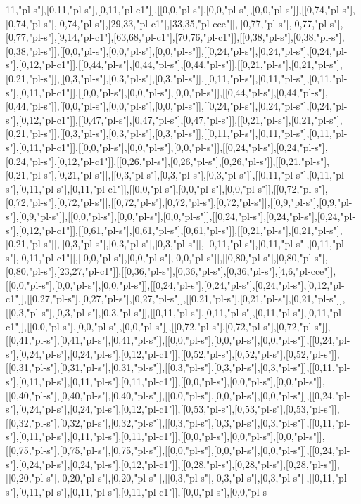 11,"pl-s"],[0,11,"pl-s"],[0,11,"pl-c1"]],[[0,0,"pl-s"],[0,0,"pl-s"],[0,0,"pl-s"]],[[0,74,"pl-s"],[0,74,"pl-s"],[0,74,"pl-s"],[29,33,"pl-c1"],[33,35,"pl-cce"]],[[0,77,"pl-s"],[0,77,"pl-s"],[0,77,"pl-s"],[9,14,"pl-c1"],[63,68,"pl-c1"],[70,76,"pl-c1"]],[[0,38,"pl-s"],[0,38,"pl-s"],[0,38,"pl-s"]],[[0,0,"pl-s"],[0,0,"pl-s"],[0,0,"pl-s"]],[[0,24,"pl-s"],[0,24,"pl-s"],[0,24,"pl-s"],[0,12,"pl-c1"]],[[0,44,"pl-s"],[0,44,"pl-s"],[0,44,"pl-s"]],[[0,21,"pl-s"],[0,21,"pl-s"],[0,21,"pl-s"]],[[0,3,"pl-s"],[0,3,"pl-s"],[0,3,"pl-s"]],[[0,11,"pl-s"],[0,11,"pl-s"],[0,11,"pl-s"],[0,11,"pl-c1"]],[[0,0,"pl-s"],[0,0,"pl-s"],[0,0,"pl-s"]],[[0,44,"pl-s"],[0,44,"pl-s"],[0,44,"pl-s"]],[[0,0,"pl-s"],[0,0,"pl-s"],[0,0,"pl-s"]],[[0,24,"pl-s"],[0,24,"pl-s"],[0,24,"pl-s"],[0,12,"pl-c1"]],[[0,47,"pl-s"],[0,47,"pl-s"],[0,47,"pl-s"]],[[0,21,"pl-s"],[0,21,"pl-s"],[0,21,"pl-s"]],[[0,3,"pl-s"],[0,3,"pl-s"],[0,3,"pl-s"]],[[0,11,"pl-s"],[0,11,"pl-s"],[0,11,"pl-s"],[0,11,"pl-c1"]],[[0,0,"pl-s"],[0,0,"pl-s"],[0,0,"pl-s"]],[[0,24,"pl-s"],[0,24,"pl-s"],[0,24,"pl-s"],[0,12,"pl-c1"]],[[0,26,"pl-s"],[0,26,"pl-s"],[0,26,"pl-s"]],[[0,21,"pl-s"],[0,21,"pl-s"],[0,21,"pl-s"]],[[0,3,"pl-s"],[0,3,"pl-s"],[0,3,"pl-s"]],[[0,11,"pl-s"],[0,11,"pl-s"],[0,11,"pl-s"],[0,11,"pl-c1"]],[[0,0,"pl-s"],[0,0,"pl-s"],[0,0,"pl-s"]],[[0,72,"pl-s"],[0,72,"pl-s"],[0,72,"pl-s"]],[[0,72,"pl-s"],[0,72,"pl-s"],[0,72,"pl-s"]],[[0,9,"pl-s"],[0,9,"pl-s"],[0,9,"pl-s"]],[[0,0,"pl-s"],[0,0,"pl-s"],[0,0,"pl-s"]],[[0,24,"pl-s"],[0,24,"pl-s"],[0,24,"pl-s"],[0,12,"pl-c1"]],[[0,61,"pl-s"],[0,61,"pl-s"],[0,61,"pl-s"]],[[0,21,"pl-s"],[0,21,"pl-s"],[0,21,"pl-s"]],[[0,3,"pl-s"],[0,3,"pl-s"],[0,3,"pl-s"]],[[0,11,"pl-s"],[0,11,"pl-s"],[0,11,"pl-s"],[0,11,"pl-c1"]],[[0,0,"pl-s"],[0,0,"pl-s"],[0,0,"pl-s"]],[[0,80,"pl-s"],[0,80,"pl-s"],[0,80,"pl-s"],[23,27,"pl-c1"]],[[0,36,"pl-s"],[0,36,"pl-s"],[0,36,"pl-s"],[4,6,"pl-cce"]],[[0,0,"pl-s"],[0,0,"pl-s"],[0,0,"pl-s"]],[[0,24,"pl-s"],[0,24,"pl-s"],[0,24,"pl-s"],[0,12,"pl-c1"]],[[0,27,"pl-s"],[0,27,"pl-s"],[0,27,"pl-s"]],[[0,21,"pl-s"],[0,21,"pl-s"],[0,21,"pl-s"]],[[0,3,"pl-s"],[0,3,"pl-s"],[0,3,"pl-s"]],[[0,11,"pl-s"],[0,11,"pl-s"],[0,11,"pl-s"],[0,11,"pl-c1"]],[[0,0,"pl-s"],[0,0,"pl-s"],[0,0,"pl-s"]],[[0,72,"pl-s"],[0,72,"pl-s"],[0,72,"pl-s"]],[[0,41,"pl-s"],[0,41,"pl-s"],[0,41,"pl-s"]],[[0,0,"pl-s"],[0,0,"pl-s"],[0,0,"pl-s"]],[[0,24,"pl-s"],[0,24,"pl-s"],[0,24,"pl-s"],[0,12,"pl-c1"]],[[0,52,"pl-s"],[0,52,"pl-s"],[0,52,"pl-s"]],[[0,31,"pl-s"],[0,31,"pl-s"],[0,31,"pl-s"]],[[0,3,"pl-s"],[0,3,"pl-s"],[0,3,"pl-s"]],[[0,11,"pl-s"],[0,11,"pl-s"],[0,11,"pl-s"],[0,11,"pl-c1"]],[[0,0,"pl-s"],[0,0,"pl-s"],[0,0,"pl-s"]],[[0,40,"pl-s"],[0,40,"pl-s"],[0,40,"pl-s"]],[[0,0,"pl-s"],[0,0,"pl-s"],[0,0,"pl-s"]],[[0,24,"pl-s"],[0,24,"pl-s"],[0,24,"pl-s"],[0,12,"pl-c1"]],[[0,53,"pl-s"],[0,53,"pl-s"],[0,53,"pl-s"]],[[0,32,"pl-s"],[0,32,"pl-s"],[0,32,"pl-s"]],[[0,3,"pl-s"],[0,3,"pl-s"],[0,3,"pl-s"]],[[0,11,"pl-s"],[0,11,"pl-s"],[0,11,"pl-s"],[0,11,"pl-c1"]],[[0,0,"pl-s"],[0,0,"pl-s"],[0,0,"pl-s"]],[[0,75,"pl-s"],[0,75,"pl-s"],[0,75,"pl-s"]],[[0,0,"pl-s"],[0,0,"pl-s"],[0,0,"pl-s"]],[[0,24,"pl-s"],[0,24,"pl-s"],[0,24,"pl-s"],[0,12,"pl-c1"]],[[0,28,"pl-s"],[0,28,"pl-s"],[0,28,"pl-s"]],[[0,20,"pl-s"],[0,20,"pl-s"],[0,20,"pl-s"]],[[0,3,"pl-s"],[0,3,"pl-s"],[0,3,"pl-s"]],[[0,11,"pl-s"],[0,11,"pl-s"],[0,11,"pl-s"],[0,11,"pl-c1"]],[[0,0,"pl-s"],[0,0,"pl-s